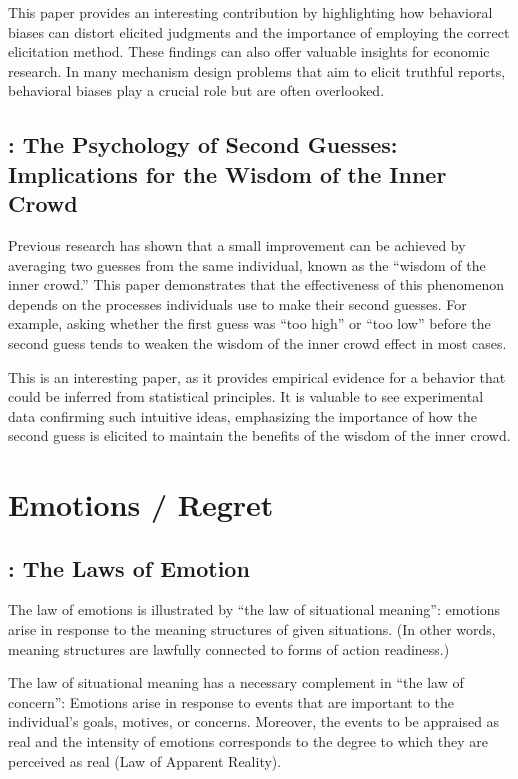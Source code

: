 \documentclass[11pt]{elegantbook}
\begin{document}
This paper provides an interesting contribution by highlighting how behavioral biases can distort elicited judgments and the importance of employing the correct elicitation method. These findings can also offer valuable insights for economic research. In many mechanism design problems that aim to elicit truthful reports, behavioral biases play a crucial role but are often overlooked.


\section{\cite{gaertig2021psychology}: The Psychology of Second Guesses: Implications for the Wisdom of the Inner Crowd}
Previous research has shown that a small improvement can be achieved by averaging two guesses from the same individual, known as the “wisdom of the inner crowd.” This paper demonstrates that the effectiveness of this phenomenon depends on the processes individuals use to make their second guesses. For example, asking whether the first guess was “too high” or “too low” before the second guess tends to weaken the wisdom of the inner crowd effect in most cases.

This is an interesting paper, as it provides empirical evidence for a behavior that could be inferred from statistical principles. It is valuable to see experimental data confirming such intuitive ideas, emphasizing the importance of how the second guess is elicited to maintain the benefits of the wisdom of the inner crowd.


\chapter{Emotions / Regret}
\section{\cite{frijda2017laws}: The Laws of Emotion}
The law of emotions is illustrated by ``the law of situational meaning'': emotions arise in response to the meaning structures of given situations. (In other words, meaning structures are lawfully connected to forms of action readiness.)

The law of situational meaning has a necessary complement in ``the law of concern'': Emotions arise in response to events that are important to the individual's goals, motives, or concerns. Moreover, the events to be appraised as real and the intensity of emotions corresponds to the degree to which they are perceived as real (Law of Apparent Reality).
\end{document}
